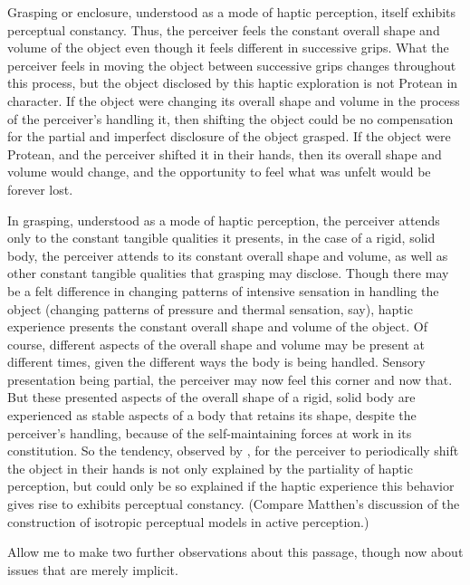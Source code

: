 Grasping or enclosure, understood as a mode of haptic perception, itself exhibits perceptual constancy. Thus, the perceiver feels the constant overall shape and volume of the object even though it feels different in successive grips. What the perceiver feels in moving the object between successive grips changes throughout this process, but the object disclosed by this haptic exploration is not Protean in character. If the object were changing its overall shape and volume in the process of the perceiver's handling it, then shifting the object could be no compensation for the partial and imperfect disclosure of the object grasped. If the object were Protean, and the perceiver shifted it in their hands, then its overall shape and volume would change, and the opportunity to feel what was unfelt would be forever lost. 

In grasping, understood as a mode of haptic perception, the perceiver attends only to the constant tangible qualities it presents, in the case of a rigid, solid body, the perceiver attends to its constant overall shape and volume, as well as other constant tangible qualities that grasping may disclose. Though there may be a felt difference in changing patterns of intensive sensation in handling the object  (changing patterns of pressure and thermal sensation, say), haptic experience presents the constant overall shape and volume of the object. Of course, different aspects of the overall shape and volume may be present at different times, given the different ways the body is being handled. Sensory presentation being partial, the perceiver may now feel this corner and now that. But these presented aspects of the overall shape of a rigid, solid body are experienced as stable aspects of a body that retains its shape, despite the perceiver's handling, because of the self-maintaining forces at work in its constitution. So the tendency, observed by \citet{Lederman:1987fr}, for the perceiver to periodically shift the object in their hands is not only explained by the partiality of haptic perception, but could only be so explained if the haptic experience this behavior gives rise to exhibits perceptual constancy. (Compare Matthen's \citeyear{Matthen:2015bq} discussion of the construction of isotropic perceptual models in active perception.)

Allow me to make two further observations about this passage, though now about issues that are merely implicit.

